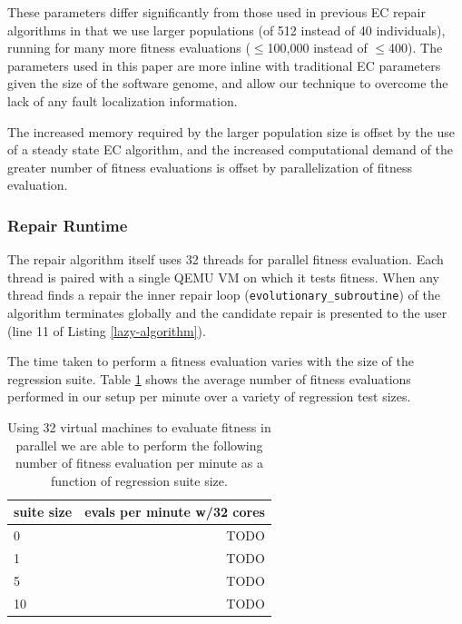 \documentclass{sigcomm-alternate}
\begin{document}
These parameters differ significantly from those used in previous EC
repair algorithms \cite{forrest2009genetic,legoues2011systematicstudy,le2012representations} in that we
use larger populations (of 512 instead of 40 individuals), running for
many more fitness evaluations ($\leq$100,000 instead of $\leq$400).  The
parameters used in this paper are more inline with traditional EC
parameters given the size of the software genome, and allow our
technique to overcome the lack of any fault localization information.

The increased memory required by the larger population size is offset
by the use of a steady state EC algorithm, and the increased
computational demand of the greater number of fitness evaluations is
offset by parallelization of fitness evaluation.
\subsubsection{Repair Runtime}
\label{sec-4-1-2}
The repair algorithm itself uses 32 threads for parallel fitness
evaluation.  Each thread is paired with a single QEMU VM on which it
tests fitness.  When any thread finds a repair the inner repair loop
(\texttt{evolutionary\_subroutine}) of the algorithm terminates globally and
the candidate repair is presented to the user (line 11 of Listing
\ref{lazy-algorithm}).

The time taken to perform a fitness evaluation varies with the size of
the regression suite.  Table \ref{test-speed} shows the average number of
fitness evaluations performed in our setup per minute over a variety
of regression test sizes.

\begin{table}[htb]
\centering
\begin{tabular}{l|r}
suite size & evals per minute w/32 cores \\
\hline
0          & TODO                        \\
1          & TODO                        \\
5          & TODO                        \\
10         & TODO                        \\
\end{tabular}\caption{\label{test-speed}Using 32 virtual machines to evaluate fitness in parallel we are able to perform the following number of fitness evaluation per minute as a function of regression suite size.}
\end{table}
\end{document}

